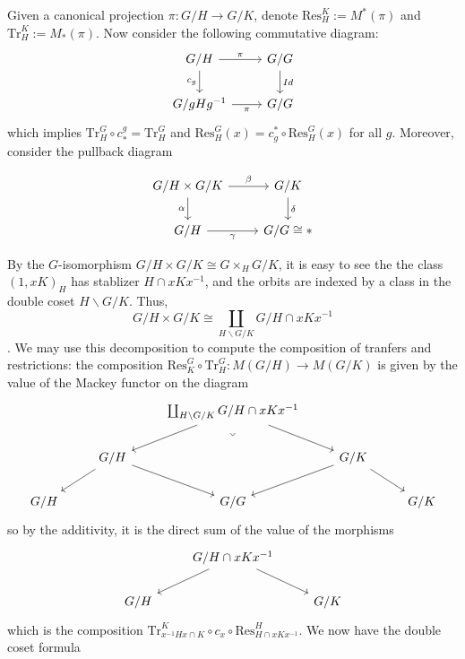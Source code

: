 \documentclass{article}
\theoremstyle{definition}
\begin{document}
Given a canonical projection $\pi: G/H\to G/K$, denote $\textrm{Res}_H^K:= M^*(\pi)$ and  $\textrm{Tr}_H^K:= M_*(\pi)$. 
 Now consider the following commutative diagram:
\[\begin{tikzcd}
	{G/H} & {G/G} \\
	{G/gHg^{-1}} & {G/G}
	\arrow["\pi", from=1-1, to=1-2]
	\arrow["{c_g}"', from=1-1, to=2-1]
	\arrow["Id", from=1-2, to=2-2]
	\arrow["\pi"', from=2-1, to=2-2]
\end{tikzcd}\]
which implies $\textrm{Tr}_H^G\circ c_*^g=\textrm{Tr}_H^G$ and $\textrm{Res}_H^G(x)=c_g^*\circ\textrm{Res}_H^G(x)$ for all $g$. Moreover, consider the pullback diagram


\[\begin{tikzcd}
	G/H\times G/K & G/K \\
	G/H & G/G\cong *
	\arrow["\beta", from=1-1, to=1-2]
	\arrow["\alpha"', from=1-1, to=2-1]
	\arrow["\delta", from=1-2, to=2-2]
	\arrow["\gamma"', from=2-1, to=2-2]
\end{tikzcd}\]

By the $G$-isomorphism $G/H\times G/K\cong G\times_H G/K$, it is easy to see the the class $(1,xK)_H$ has stablizer $H\cap xKx^{-1}$, and the orbits are indexed by a class in the double coset $H\backslash G/K$. Thus, $$G/H\times G/K\cong \coprod_{H\backslash G/K}G/H\cap xKx^{-1}$$. 
We may use this decomposition to compute the composition of tranfers and restrictions: the composition $\textrm{Res}_K^G\circ \textrm{Tr}_H^G: M(G/H)\to M(G/K)$ is given by the value of the Mackey functor on the diagram 
\[\begin{tikzcd}
	&& {\coprod_{H\backslash G/K} G/H\cap xKx^{-1}} \\
	& {G/H} && {G/K} \\
	{G/H} && {G/G} && {G/K}
	\arrow[from=1-3, to=2-2]
	\arrow[from=1-3, to=2-4]
	\arrow["\lrcorner"{anchor=center, pos=0.125, rotate=-45}, draw=none, from=1-3, to=3-3]
	\arrow[from=2-2, to=3-1]
	\arrow[from=2-2, to=3-3]
	\arrow[from=2-4, to=3-3]
	\arrow[from=2-4, to=3-5]
\end{tikzcd}\]
so by the additivity, it is the direct sum of the value of the morphisms
\[\begin{tikzcd}
	& {G/H\cap xKx^{-1}} \\
	{G/H} && {G/K}
	\arrow[from=1-2, to=2-1]
	\arrow[from=1-2, to=2-3]
\end{tikzcd}\]
which is the composition $\textrm{Tr}_{x^{-1}Hx\cap K}^{K}\circ c_{x}\circ \textrm{Res}_{H\cap xKx^{-1}}^{H}$. We now have the double coset formula
\end{document}
